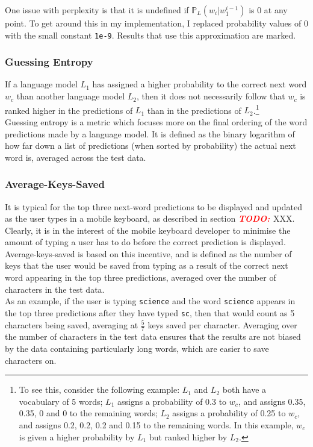 \documentclass[a4paper, 12pt]{report}
\newcommand{\todo}{\textbf{\textit{\textcolor{red}{TODO: }}}}
\newcommand{\ttt}[1]{\texttt{#1}}
\begin{document}
One issue with perplexity is that it is undefined if $\mathbb{P}_L(w_i | w_1^{i-1})$ is 0 at any point. To get around this in my implementation, I replaced probability values of 0 with the small constant \ttt{1e-9}. Results that use this approximation are marked.

\subsubsection*{Guessing Entropy}

If a language model $L_1$ has assigned a higher probability to the correct next word $w_c$ than another language model $L_2$, then it does not necessarily follow that $w_c$ is ranked higher in the predictions of $L_1$ than in the predictions of $L_2$.\footnote{To see this, consider the following example: $L_1$ and $L_2$ both have a vocabulary of 5 words; $L_1$ assigns a probability of 0.3 to $w_c$, and assigns 0.35, 0.35, 0 and 0 to the remaining words; $L_2$ assigns a probability of 0.25 to $w_c$, and assigns 0.2, 0.2, 0.2 and 0.15 to the remaining words. In this example, $w_c$ is given a higher probability by $L_1$ but ranked higher by $L_2$.} \\

Guessing entropy is a metric which focuses more on the final ordering of the word predictions made by a language model. It is defined as the binary logarithm of how far down a list of predictions (when sorted by probability) the actual next word is, averaged across the test data.

\subsubsection*{Average-Keys-Saved}

It is typical for the top three next-word predictions to be displayed and updated as the user types in a mobile keyboard, as described in section \todo{XXX}. Clearly, it is in the interest of the mobile keyboard developer to minimise the amount of typing a user has to do before the correct prediction is displayed. Average-keys-saved is based on this incentive, and is defined as the number of keys that the user would be saved from typing as a result of the correct next word appearing in the top three predictions, averaged over the number of characters in the test data. \\

As an example, if the user is typing \ttt{science} and the word \ttt{science} appears in the top three predictions after they have typed \ttt{sc}, then that would count as 5 characters being saved, averaging at $\frac{5}{7}$ keys saved per character. Averaging over the number of characters in the test data ensures that the results are not biased by the data containing particularly long words, which are easier to save characters on.
\end{document}
